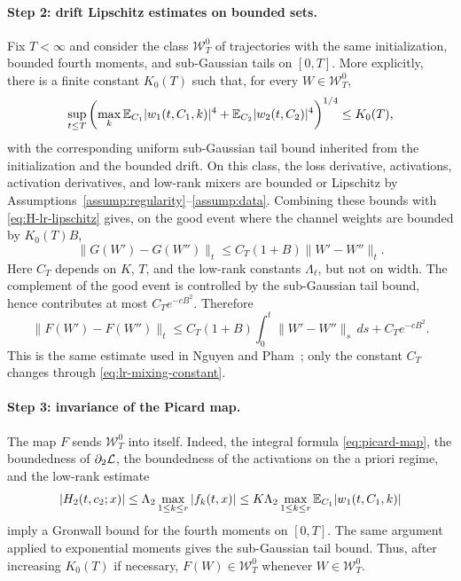 \paragraph{Step 2: drift Lipschitz estimates on bounded sets.}
Fix $T<\infty$ and consider the class $\mathcal W_T^0$ of trajectories with the same initialization, bounded fourth moments, and sub-Gaussian tails on $[0,T]$. More explicitly, there is a finite constant $K_0(T)$ such that, for every $W\in\mathcal W_T^0$,
\begin{equation}
\sup_{t\le T}
\left(
\max_k \mathbb{E}_{C_1}|w_1(t,C_1,k)|^4
+
\mathbb{E}_{C_2}|w_2(t,C_2)|^4
\right)^{1/4}
\le K_0(T),
\end{equation}
with the corresponding uniform sub-Gaussian tail bound inherited from the initialization and the bounded drift. On this class, the loss derivative, activations, activation derivatives, and low-rank mixers are bounded or Lipschitz by Assumptions~\ref{assump:regularity}--\ref{assump:data}. Combining these bounds with \eqref{eq:H-lr-lipschitz} gives, on the good event where the channel weights are bounded by $K_0(T)B$,
\begin{equation}
\|G(W')-G(W'')\|_t
\le
C_T(1+B)\|W'-W''\|_t .
\label{eq:drift-good}
\end{equation}
Here $C_T$ depends on $K$, $T$, and the low-rank constants $\Lambda_\ell$, but not on width. The complement of the good event is controlled by the sub-Gaussian tail bound, hence contributes at most $C_T e^{-cB^2}$. Therefore
\begin{equation}
\|F(W')-F(W'')\|_t
\le
C_T(1+B)\int_0^t \|W'-W''\|_s\,ds
+
C_T e^{-cB^2}.
\label{eq:picard-difference}
\end{equation}
This is the same estimate used in Nguyen and Pham~\cite{nguyen2023}; only the constant $C_T$ changes through \eqref{eq:lr-mixing-constant}.

\paragraph{Step 3: invariance of the Picard map.}
The map $F$ sends $\mathcal W_T^0$ into itself. Indeed, the integral formula \eqref{eq:picard-map}, the boundedness of $\partial_2\mathcal{L}$, the boundedness of the activations on the a priori regime, and the low-rank estimate
\begin{equation}
|H_2(t,c_2;x)|
\le
\Lambda_2 \max_{1\le k\le r}|f_k(t,x)|
\le
K\Lambda_2
\max_{1\le k\le r}\mathbb{E}_{C_1}|w_1(t,C_1,k)|
\end{equation}
imply a Gronwall bound for the fourth moments on $[0,T]$. The same argument applied to exponential moments gives the sub-Gaussian tail bound. Thus, after increasing $K_0(T)$ if necessary, $F(W)\in\mathcal W_T^0$ whenever $W\in\mathcal W_T^0$.

